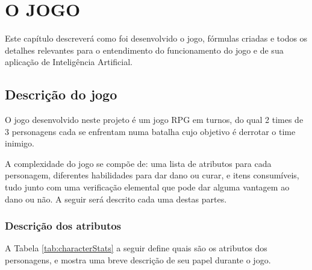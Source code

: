 \documentclass[
	12pt,					%
	openright,				%
	oneside,				%
	a4paper,				%
	bibjustif,				%
	chapter=TITLE,			%
	english,				%
	brazil,					%
	]{abntex2}
\begin{document}
\FloatBarrier
\newpage %
\chapter{O JOGO}

	Este capítulo descreverá como foi desenvolvido o jogo,
	fórmulas criadas e todos os detalhes relevantes para o entendimento do funcionamento do jogo e de sua aplicação de Inteligência Artificial.
	
	\FloatBarrier
	\section{Descrição do jogo}
	O jogo desenvolvido neste projeto é um jogo RPG em turnos,
	do qual 2 times de 3 personagens cada se enfrentam numa batalha cujo objetivo é derrotar o time inimigo.
	
	A complexidade do jogo se compõe de:
	uma lista de atributos para cada personagem,
	diferentes habilidades para dar dano ou curar,
	e itens consumíveis,
	tudo junto com uma verificação elemental que pode dar alguma vantagem ao dano ou não.
	A seguir será descrito cada uma destas partes.
	
	\subsection{Descrição dos atributos}
	A Tabela \ref{tab:characterStats} a seguir define quais são os atributos dos personagens,
	e mostra uma breve descrição de seu papel durante o jogo.
	
\end{document}
